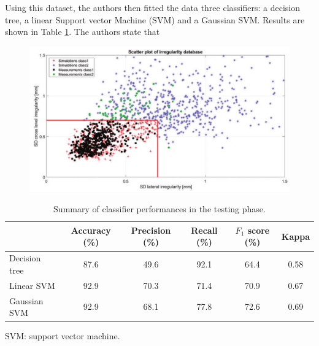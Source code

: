 Using this dataset, the authors then fitted the data three classifiers: a decision tree, a linear Support vector Machine (SVM) and a Gaussian SVM. Results are shown in Table \ref{Table:DeRosa-2021-Results}. The authors state that 

\begin{figure}[H]
    \centering
    \includegraphics[width=12cm]{Cap2_LitReview/Track_Quality_Accel/DeRosa (2021)/dataset.png}
    \caption{\cite{DeRosa2021}}
    \label{fig:DeRosa-dataset}
\end{figure}

\begin{table}[ht]
\centering
\begin{tabular}{l c c c c c}
\hline
 & Accuracy (\%) & Precision (\%) & Recall (\%) & $F_1$ score (\%) & Kappa \\
\hline
Decision tree & 87.6 & 49.6 & 92.1 & 64.4 & 0.58 \\
Linear SVM & 92.9 & 70.3 & 71.4 & 70.9 & 0.67 \\
Gaussian SVM & 92.9 & 68.1 & 77.8 & 72.6 & 0.69 \\
\hline
\end{tabular}
\vspace{0.5em}
\small SVM: support vector machine.
\caption{Summary of classifier performances in the testing phase.}
\label{Table:DeRosa-2021-Results}
\end{table}


